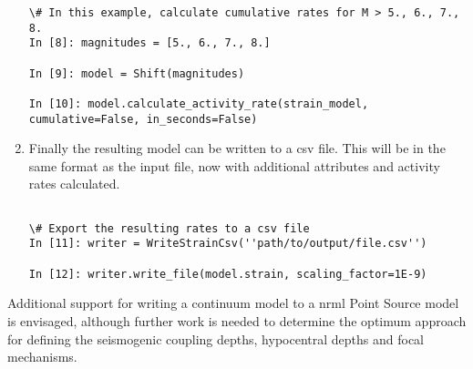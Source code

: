 \begin{enumerate}
\begin{Verbatim}[frame=single, commandchars=\\\{\}, fontsize=\scriptsize]
\# In this example, calculate cumulative rates for M > 5., 6., 7., 8.
In [8]: magnitudes = [5., 6., 7., 8.]

In [9]: model = Shift(magnitudes)

In [10]: model.calculate_activity_rate(strain_model, cumulative=False, in_seconds=False)

\end{Verbatim}

\item Finally the resulting model can be written to a csv file. This will be in the same format as the input file, now with additional attributes and activity rates calculated.

\begin{Verbatim}[frame=single, commandchars=\\\{\}, fontsize=\scriptsize]

\# Export the resulting rates to a csv file
In [11]: writer = WriteStrainCsv(''path/to/output/file.csv'')

In [12]: writer.write_file(model.strain, scaling_factor=1E-9)
\end{Verbatim}
\end{enumerate}


Additional support for writing a continuum model to a nrml Point Source model is envisaged, although further work is needed to determine the optimum approach for defining the seismogenic coupling depths, hypocentral depths and focal mechanisms. 
 



 
 
 
  


